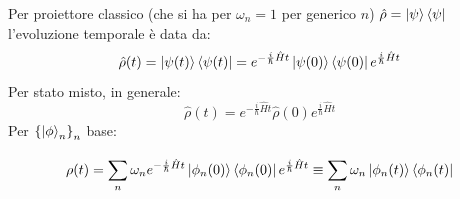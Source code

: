 \documentclass[10pt, a4paper]{scrartcl}
\numberwithin{equation}{subsection}
\theoremstyle{style1}
\newenvironment{boxenv}[1][]{
    \begin{eqbox}[#1]
    }{
   \end{eqbox}
}
\begin{document}
Per proiettore classico (che si ha per $\omega_n = 1$ per generico $n$) $\hat{\rho }= \ket{\psi } \bra{\psi } $ l'evoluzione temporale \`e data da:
\[
\hat{\rho }(t) = \ket{\psi (t)} \bra{\psi (t)} = e^{- \frac{i}{\hbar }\hat{H}t}  \ket{\psi (0)} \bra{\psi (0)}  e^{\frac{i}{\hbar }\hat{H}t} 
\] 
Per stato misto, in generale:
\[
\hat{\rho }(t) = e^{-\frac{i}{\hbar }\hat{H}t} \hat{\rho } (0) e^{\frac{i}{\hbar } \hat{H}t} 
\] 
Per $\left\{ \ket{\phi } _n \right\} _n$ base:
\begin{boxenv}[]
\begin{equation}
	\rho (t) = \sum_{n}^{} \omega_n e^{-\frac{i}{\hbar }\hat{H}t} \ket{\phi _n(0)} \bra{\phi _n(0)} e^{\frac{i}{\hbar }\hat{H}t} \equiv \sum_{n}^{} \omega_n \ket{\phi _n(t)} \bra{\phi _n(t)} 
\end{equation}
\end{boxenv}
\end{document}
